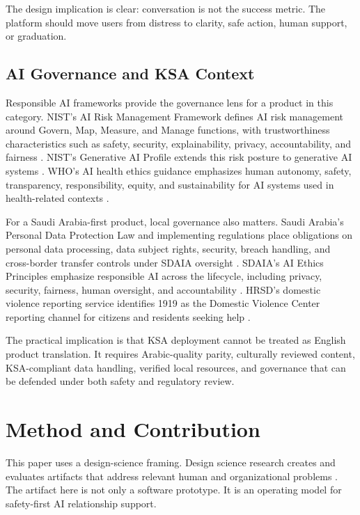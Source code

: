 \documentclass[11pt]{article}
\begin{document}
The design implication is clear: conversation is not the success metric. The platform should move users from distress to clarity, safe action, human support, or graduation.

\subsection{AI Governance and KSA Context}

Responsible AI frameworks provide the governance lens for a product in this category. NIST's AI Risk Management Framework defines AI risk management around Govern, Map, Measure, and Manage functions, with trustworthiness characteristics such as safety, security, explainability, privacy, accountability, and fairness \citep{nist2023}. NIST's Generative AI Profile extends this risk posture to generative AI systems \citep{nist2024}. WHO's AI health ethics guidance emphasizes human autonomy, safety, transparency, responsibility, equity, and sustainability for AI systems used in health-related contexts \citep{who2021}.

For a Saudi Arabia-first product, local governance also matters. Saudi Arabia's Personal Data Protection Law and implementing regulations place obligations on personal data processing, data subject rights, security, breach handling, and cross-border transfer controls under SDAIA oversight \citep{sdaia2023pdpl,oecd2025}. SDAIA's AI Ethics Principles emphasize responsible AI across the lifecycle, including privacy, security, fairness, human oversight, and accountability \citep{sdaia2023ai}. HRSD's domestic violence reporting service identifies 1919 as the Domestic Violence Center reporting channel for citizens and residents seeking help \citep{hrsd2025}.

The practical implication is that KSA deployment cannot be treated as English product translation. It requires Arabic-quality parity, culturally reviewed content, KSA-compliant data handling, verified local resources, and governance that can be defended under both safety and regulatory review.

\section{Method and Contribution}

This paper uses a design-science framing. Design science research creates and evaluates artifacts that address relevant human and organizational problems \citep{hevner2004}. The artifact here is not only a software prototype. It is an operating model for safety-first AI relationship support.
\end{document}
